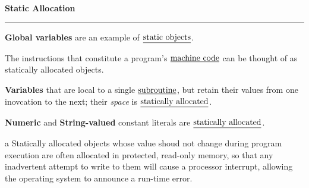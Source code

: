 \nopagenumbers
{\bf Static Allocation}
\vskip 1mm
\hrule

\vskip 6pt
{\bf Global variables} are an example of $\underline{\hbox{static objects}}$.

\vskip 6pt
The instructions that constitute a program's $\underline{\hbox{machine code}}$ can be thought of as statically allocated objects.

\vskip 6pt
{\bf Variables} that are local to a single $\underline{\hbox{subroutine}}$, but retain their values from one inovcation to the next; their {\it space} is $\underline{\hbox{statically allocated}}$.

\vskip 6pt
{\bf Numeric} and {\bf String-valued} constant literals are $\underline{\hbox{statically allocated}}$.

\vskip 6pt
a Statically allocated objects whose value shoud not change during program execution are often allocated in protected, read-only memory, so that any inadvertent attempt to write to them will cause a processor interrupt, allowing the operating system to announce a run-time error.

\vfill\eject
\bye

